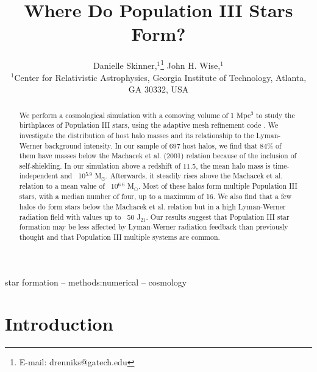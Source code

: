 \documentclass[a4paper,fleqn,usenatbib]{mnras}
\title[Where Do Pop III Stars Form?]{Where Do Population III Stars Form?}
\author[Danielle Skinner et al.]{
Danielle Skinner,$^{1}$\thanks{E-mail: drenniks@gatech.edu}
John H. Wise,$^{1}$
\\
$^{1}$Center for Relativistic Astrophysics, Georgia Institute of Technology, 
Atlanta, GA 30332, USA\\
}
\begin{document}
\label{firstpage}
\pagerange{\pageref{firstpage}--\pageref{lastpage}}
\maketitle

\begin{abstract}
We perform a cosmological simulation with a comoving volume of 1 Mpc$^{3}$ to study the birthplaces of Population III stars, using the adaptive mesh refinement code \enzo{}. We investigate the distribution of host halo masses and its relationship to the Lyman-Werner background intensity.  In our sample of 697 host halos, we find that 84\% of them have masses below the Machacek et al. (2001) relation because of the inclusion of \hh{} self-shielding.  In our simulation above a redshift of 11.5, the mean halo mass is time-independent and ~10$^{5.9}$ M$_{\odot}$. Afterwards, it steadily rises above the Machacek et al. relation to a mean value of ~10$^{6.6}$ M$_{\odot}$. Most of these halos form multiple Population III stars, with a median number of four, up to a maximum of 16. We also find that a few halos do form stars below the Machacek et al. relation but in a high Lyman-Werner radiation field with values up to ~50 J$_{21}$. Our results suggest that Population III star formation may be less affected by Lyman-Werner radiation feedback than previously thought and that Population III multiple systems are common.
\end{abstract}

\begin{keywords}
star formation -- methods:numerical -- cosmology
\end{keywords}


\section{Introduction}
\end{document}
